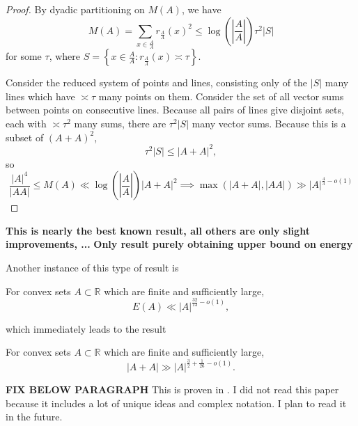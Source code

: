 \documentclass[12pt]{amsart}
\begin{document}
\begin{proof}
By dyadic partitioning on \(M(A)\), we have
\[
    M(A) = \sum _{x \in \frac{A}{A} } r_{\frac{A}{A} } (x)^{2} \leq  \log \left( \left\lvert \frac{A}{A} \right\rvert   \right) \tau ^{2} \left\lvert S \right\rvert
\]
for some \(\tau\), where \(S = \left\{ x \in \frac{A}{A}  : r_{\frac{A}{A} } (x) \asymp \tau \right\} \).

Consider the reduced system of points and lines, consisting only of the \(\left\lvert S \right\rvert \) many lines which
have \(\asymp \tau\) many points on them. Consider the set of all vector sums between points on
consecutive lines. Because all pairs of lines give disjoint sets, each with \(\asymp \tau ^{2}\) many sums, there are
\(\tau^{2}\left\lvert S \right\rvert \) many vector sums. Because this is a subset of \((A+A)^{2}\),
\[
    \tau^{2} \left\lvert S \right\rvert \leq \left\lvert A+A \right\rvert  ^{2}
,\]
so
\[
    \frac{\left\lvert A \right\rvert ^{4}}{\left\lvert AA\right\rvert } \leq M(A) \ll \log \left( \left\lvert \frac{A}{A} \right\rvert   \right)  \left\lvert A+A \right\rvert  ^{2} \implies \max \left( \left\lvert A+A \right\rvert ,\left\lvert AA \right\rvert  \right) \gg \left\lvert A \right\rvert ^{\frac{4}{3} - o(1)}
\]

\end{proof}

\textbf{This is nearly the best known result, all others are only slight improvements, ... }
\textbf{Only result purely obtaining upper bound on energy}

Another instance of this type of result is

\begin{theorem}
For convex sets \(A \subset \mathbb{R} \) which are finite and sufficiently large,
\[
    E(A) \ll \left\lvert A \right\rvert ^{\frac{32}{13} - o(1)}
,\]
\end{theorem}
which immediately leads to the result

\begin{corollary}
For convex sets \(A \subset \mathbb{R} \) which are finite and sufficiently large,
\[
    \left\lvert A+A \right\rvert \gg \left\lvert A \right\rvert ^{\frac{3}{2} + \frac{1}{26} - o(1)}
.\]
\end{corollary}

\textbf{FIX BELOW PARAGRAPH}
This is proven in \cite{shkredov-new-results-higher-energy}. I did not read this
paper because it includes a lot of unique ideas and complex notation. I plan to read it
in the future.

\end{document}
